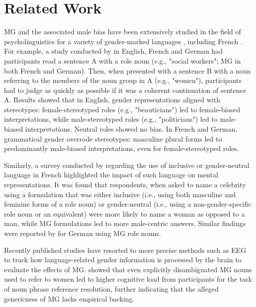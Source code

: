 \section{Related Work}
MG and the associated male bias have been extensively studied in the field of psycholinguistics for a variety of gender-marked languages \citep{silveiraGenericMasculineWords1980,stahlbergNameYourFavorite2001,safinaEffectsGrammaticalGender2024}, including French \citep{gygaxMasculineFormIts2012,richyDemelerEffetsStereotypes2021}. For example, a study conducted by \citet{gygaxGenericallyIntendedSpecifically2008} in English, French and German had participants read a sentence A with a role noun (e.g., "social workers"; MG in both French and German). Then, when presented with a sentence B with a noun referring to the members of the noun group in A (e.g., "women"), participants had to judge as quickly as possible if it was a coherent continuation of sentence A. Results showed that in English, gender representations aligned with stereotypes: female-stereotyped roles (e.g., "beauticians") led to female-biased interpretations, while male-stereotyped roles (e.g., "politicians") led to male-biased interpretations. Neutral roles showed no bias. In French and German, grammatical gender overrode stereotypes: masculine plural forms led to predominantly male-biased interpretations, even for female-stereotyped roles.

Similarly, a survey conducted by \citet{harrisinteractiveLecritureInclusivePopulation2017} regarding the use of inclusive or gender-neutral language in French highlighted the impact of such language on mental representations. It was found that respondents, when asked to name a celebrity using a formulation that was either inclusive (i.e., using both masculine and feminine forms of a role noun) or gender-neutral (i.e., using a non-gender-specific role noun or an equivalent) were more likely to name a woman as opposed to a man, while MG formulations led to more male-centric answers. Similar findings were reported by \citet{stahlbergNameYourFavorite2001} for German using MG role nouns.

Recently published studies have resorted to more precise methods such as EEG to track how language-related gender information is processed by the brain to evaluate the effects of MG. \citet{glimGenericMasculineRole2024} showed that even explicitly disambiguated
MG nouns used to refer to women led to higher cognitive load from participants for the task of noun phrase reference resolution, further indicating that the alleged genericness of MG lacks empirical backing.

